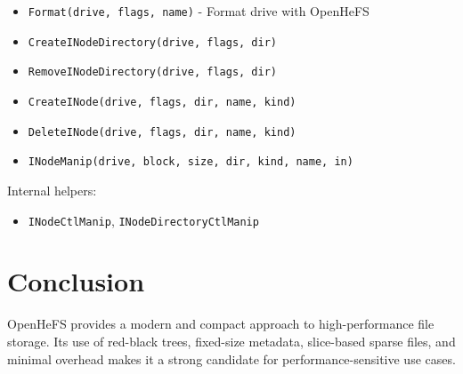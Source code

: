 \documentclass{article}
\begin{document}
\begin{itemize}
  \item \texttt{Format(drive, flags, name)} - Format drive with OpenHeFS
  \item \texttt{CreateINodeDirectory(drive, flags, dir)}
  \item \texttt{RemoveINodeDirectory(drive, flags, dir)}
  \item \texttt{CreateINode(drive, flags, dir, name, kind)}
  \item \texttt{DeleteINode(drive, flags, dir, name, kind)}
  \item \texttt{INodeManip(drive, block, size, dir, kind, name, in)}
\end{itemize}

Internal helpers:
\begin{itemize}
  \item \texttt{INodeCtlManip}, \texttt{INodeDirectoryCtlManip}
\end{itemize}

\section{Conclusion}
OpenHeFS provides a modern and compact approach to high-performance file storage.
Its use of red-black trees, fixed-size metadata, slice-based sparse files, and minimal overhead makes it a strong candidate for performance-sensitive use cases.
\end{document}
